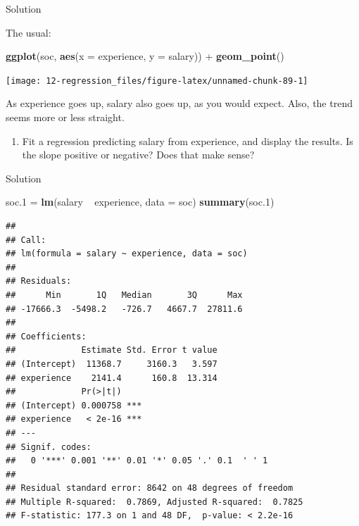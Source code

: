 \documentclass[]{tufte-book}
\newenvironment{Shaded}{}{}
\newcommand{\DataTypeTok}[1]{\textcolor[rgb]{0.56,0.13,0.00}{#1}}
\newcommand{\FloatTok}[1]{\textcolor[rgb]{0.25,0.63,0.44}{#1}}
\newcommand{\KeywordTok}[1]{\textcolor[rgb]{0.00,0.44,0.13}{\textbf{#1}}}
\newcommand{\NormalTok}[1]{#1}
\newcommand{\OperatorTok}[1]{\textcolor[rgb]{0.40,0.40,0.40}{#1}}
\newcommand{\StringTok}[1]{\textcolor[rgb]{0.25,0.44,0.63}{#1}}
\providecommand{\tightlist}{%
  \setlength{\itemsep}{0pt}\setlength{\parskip}{0pt}}
\theoremstyle{definition}
\theoremstyle{definition}
\theoremstyle{definition}
\theoremstyle{remark}
\begin{document}
Solution

The usual:

\begin{Shaded}
\begin{Highlighting}[]
\KeywordTok{ggplot}\NormalTok{(soc, }\KeywordTok{aes}\NormalTok{(}\DataTypeTok{x =}\NormalTok{ experience, }\DataTypeTok{y =}\NormalTok{ salary)) }\OperatorTok{+}\StringTok{ }
\StringTok{    }\KeywordTok{geom_point}\NormalTok{()}
\end{Highlighting}
\end{Shaded}

\texttt{[image: 12-regression\_files/figure-latex/unnamed-chunk-89-1]}

As experience goes up, salary also goes up, as you would expect. Also,
the trend seems more or less straight.

\begin{enumerate}
\def\labelenumi{(\alph{enumi})}
\setcounter{enumi}{2}
\tightlist
\item
  Fit a regression predicting salary from experience, and display the
  results. Is the slope positive or negative? Does that make sense?
\end{enumerate}

Solution

\begin{Shaded}
\begin{Highlighting}[]
\NormalTok{soc}\FloatTok{.1}\NormalTok{ =}\StringTok{ }\KeywordTok{lm}\NormalTok{(salary }\OperatorTok{~}\StringTok{ }\NormalTok{experience, }\DataTypeTok{data =}\NormalTok{ soc)}
\KeywordTok{summary}\NormalTok{(soc}\FloatTok{.1}\NormalTok{)}
\end{Highlighting}
\end{Shaded}

\begin{verbatim}
## 
## Call:
## lm(formula = salary ~ experience, data = soc)
## 
## Residuals:
##      Min       1Q   Median       3Q      Max 
## -17666.3  -5498.2   -726.7   4667.7  27811.6 
## 
## Coefficients:
##             Estimate Std. Error t value
## (Intercept)  11368.7     3160.3   3.597
## experience    2141.4      160.8  13.314
##             Pr(>|t|)    
## (Intercept) 0.000758 ***
## experience   < 2e-16 ***
## ---
## Signif. codes:  
##   0 '***' 0.001 '**' 0.01 '*' 0.05 '.' 0.1  ' ' 1
## 
## Residual standard error: 8642 on 48 degrees of freedom
## Multiple R-squared:  0.7869, Adjusted R-squared:  0.7825 
## F-statistic: 177.3 on 1 and 48 DF,  p-value: < 2.2e-16
\end{verbatim}
\end{document}
